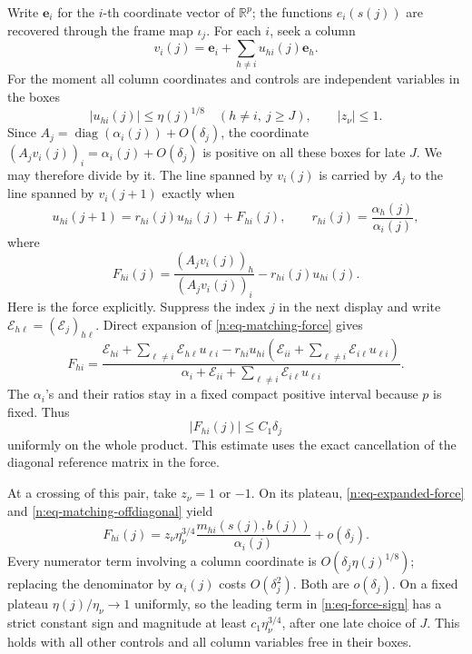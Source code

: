 Write \(\mathbf e_i\) for the \(i\)-th coordinate vector of \(\mathbb R^p\);
the functions \(e_i(s(j))\) are recovered through the frame map \(\iota_j\).
For each \(i\), seek a column
\[
 v_i(j)=\mathbf e_i+\sum_{h\neq i}u_{hi}(j)\mathbf e_h.
\]
For the moment all column coordinates and controls are independent
variables in the boxes
\begin{equation}
 |u_{hi}(j)|\leq\eta(j)^{1/8}\quad(h\neq i,\ j\geq J),
 \qquad |z_\nu|\leq1.
 \label{n:eq-matching-boxes}
\end{equation}
Since \(A_j=\operatorname{diag}(\alpha_i(j))+O(\delta_j)\),
the coordinate \((A_jv_i(j))_i=\alpha_i(j)+O(\delta_j)\) is
positive on all these boxes for late \(J\). We may therefore divide by it.
The line spanned by \(v_i(j)\) is carried by \(A_j\) to the line spanned by \(v_i(j+1)\)
exactly when
\begin{equation}
 u_{hi}(j+1)=r_{hi}(j)u_{hi}(j)+F_{hi}(j),\qquad
 r_{hi}(j)=\frac{\alpha_h(j)}{\alpha_i(j)},
 \label{n:eq-matching-recursion}
\end{equation}
where
\begin{equation}
 F_{hi}(j)
 =\frac{(A_jv_i(j))_h}{(A_jv_i(j))_i}
       -r_{hi}(j)u_{hi}(j).
 \label{n:eq-matching-force}
\end{equation}
Here is the force explicitly.  Suppress the index \(j\) in the next display
and write \(\mathcal E_{h\ell}=(\mathcal E_j)_{h\ell}\).  Direct expansion
of \eqref{n:eq-matching-force} gives
\begin{equation}
 F_{hi}=
 \frac{\displaystyle
   \mathcal E_{hi}+\sum_{\ell\neq i}\mathcal E_{h\ell}u_{\ell i}
   -r_{hi}u_{hi}
       \left(\mathcal E_{ii}
             +\sum_{\ell\neq i}\mathcal E_{i\ell}u_{\ell i}\right)}
 {\displaystyle
   \alpha_i+\mathcal E_{ii}
             +\sum_{\ell\neq i}\mathcal E_{i\ell}u_{\ell i}} .
 \label{n:eq-expanded-force}
\end{equation}
The \(\alpha_i\)'s and their ratios stay in a fixed compact
positive interval because \(p\) is fixed.  Thus
\begin{equation}
 |F_{hi}(j)|\leq C_1\delta_j
 \label{n:eq-force-bound}
\end{equation}
uniformly on the whole product.  This estimate uses the exact cancellation
of the diagonal reference matrix in the force.

At a crossing of this pair, take \(z_\nu=1\) or \(-1\).  On its plateau,
\eqref{n:eq-expanded-force} and \eqref{n:eq-matching-offdiagonal} yield
\begin{equation}
 F_{hi}(j)=
 z_\nu\eta_\nu^{3/4}
     \frac{m_{hi}(s(j),b(j))}{\alpha_i(j)}
       +o(\delta_j).
 \label{n:eq-force-sign}
\end{equation}
Every numerator term involving a column coordinate is
\(O(\delta_j\eta(j)^{1/8})\); replacing the denominator by \(\alpha_i(j)\)
costs \(O(\delta_j^2)\).  Both are \(o(\delta_j)\).  On a fixed plateau
\(\eta(j)/\eta_\nu\to1\) uniformly, so the leading term in
\eqref{n:eq-force-sign} has a strict constant sign and magnitude at least
\(c_1\eta_\nu^{3/4}\), after one late choice of \(J\).  This holds with
all other controls and all column variables free in their boxes.

